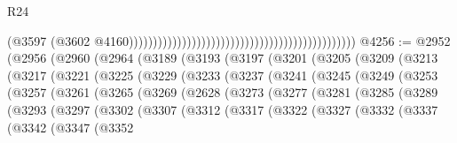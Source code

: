 \begin{lexlean}{R24}
\begin{coremodule}
                                                                                              (@3597
                                                                                                (@3602
                                                                                                  @4160)))))))))))))))))))))))))))))))))))))))))))))))
@4256 := @2952
    (@2956
      (@2960
        (@2964
          (@3189
            (@3193
              (@3197
                (@3201
                  (@3205
                    (@3209
                      (@3213
                        (@3217
                          (@3221
                            (@3225
                              (@3229
                                (@3233
                                  (@3237
                                    (@3241
                                      (@3245
                                        (@3249
                                          (@3253
                                            (@3257
                                              (@3261
                                                (@3265
                                                  (@3269
                                                    (@2628
                                                      (@3273
                                                        (@3277
                                                          (@3281
                                                            (@3285
                                                              (@3289
                                                                (@3293
                                                                  (@3297
                                                                    (@3302
                                                                      (@3307
                                                                        (@3312
                                                                          (@3317
                                                                            (@3322
                                                                              (@3327
                                                                                (@3332
                                                                                  (@3337
                                                                                    (@3342
                                                                                      (@3347
                                                                                        (@3352

\end{coremodule}
\end{lexlean}
